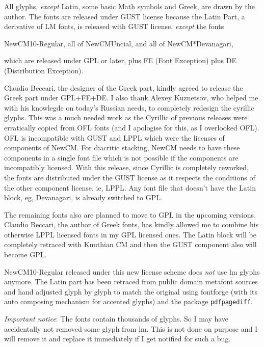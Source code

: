 \documentclass{article}
\newcommand{\ctosc}[1]{{\ctoscseries#1}}
\begin{document}
All glyphs, \textit{except} Latin, some basic Math symbols and Greek, are drawn by the author.
The fonts are released under \ctosc{GUST} license because the Latin Part, a derivative of LM fonts,
is released with \ctosc{GUST} license,
\textit{except} the fonts
\begin{center}
NewCM10-Regular, all of NewCMUncial, and all of NewCM*Devanagari,
\end{center}
which are released under \ctosc{GPL} or later, plus \ctosc{FE} (Font Exception)
plus \ctosc{DE} (Distribution Exception).



Claudio Beccari, the designer of the Greek part, kindly agreed to
release the Greek part under
\ctosc{GPL}+\ctosc{FE+DE}.  I also thank Alexey
Kuznetsov, who helped me with his knowlegde on today's Russian needs,
to completely redesign the cyrillic glyphs.
This was a much needed
work as the Cyrillic of previous releases were erratically copied from
\ctosc{OFL} fonts (and I apologise for this, as I overlooked \ctosc{OFL}). \ctosc{OFL} is
incompatible with \ctosc{GUST} and \ctosc{LPPL} which were the licenses of components
of NewCM. For diacritic stacking, NewCM needs to have these components
in a single font file which is not possible if the components are
incompatibly licensed. With this release, since Cyrillic is completely
reworked, the fonts are distributed under the \ctosc{GUST} license as it
respects the conditions of the other component license, ie,
\ctosc{LPPL}. Any font file that doesn't have the Latin block, eg,
Devanagari, is already switched to \ctosc{GPL}.

The remaining fonts also are planned to move to \ctosc{GPL} in the upcoming
versions. Claudio Beccari, the author of Greek fonts, has kindly
allowed me to combine his otherwise \ctosc{LPPL} licensed fonts in my \ctosc{GPL}
licensed ones. The Latin block will be completely retraced with
Knuthian \ctosc{CM} and then the \ctosc{GUST} component also will become \ctosc{GPL}.

NewCM10-Regular released under this new license scheme does \textit{not} use lm glyphs
anymore. The Latin part has been retraced from public domain metafont sources
and hand adjusted glyph by glyph to match the original using fontforge
(with its auto composing mechanism for accented glyphs)
and the package
\verb|pdfpagediff|. 

\textit{Important notice}: The fonts contain thousands of glyphs. So I may have accidentally
not removed some glyph from lm. This is not done on purpose and I will remove it and
replace it immediately if I get notified for such a bug.
\end{document}
